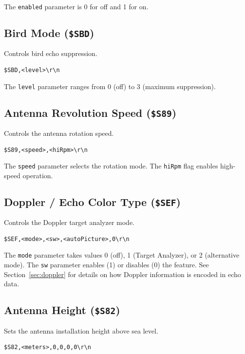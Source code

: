 \documentclass[11pt,letterpaper]{article}
\begin{document}
The \texttt{enabled} parameter is 0 for off and 1 for on.


\subsection{Bird Mode (\texttt{\$SBD})}

Controls bird echo suppression.

\begin{lstlisting}
$SBD,<level>\r\n
\end{lstlisting}

The \texttt{level} parameter ranges from 0 (off) to 3 (maximum suppression).


\subsection{Antenna Revolution Speed (\texttt{\$S89})}

Controls the antenna rotation speed.

\begin{lstlisting}
$S89,<speed>,<hiRpm>\r\n
\end{lstlisting}

The \texttt{speed} parameter selects the rotation mode. The \texttt{hiRpm} flag enables high-speed operation.


\subsection{Doppler / Echo Color Type (\texttt{\$SEF})}

Controls the Doppler target analyzer mode.

\begin{lstlisting}
$SEF,<mode>,<sw>,<autoPicture>,0\r\n
\end{lstlisting}

The \texttt{mode} parameter takes values 0 (off), 1 (Target Analyzer), or 2 (alternative mode). The \texttt{sw} parameter enables (1) or disables (0) the feature. See Section~\ref{sec:doppler} for details on how Doppler information is encoded in echo data.


\subsection{Antenna Height (\texttt{\$S82})}

Sets the antenna installation height above sea level.

\begin{lstlisting}
$S82,<meters>,0,0,0,0\r\n
\end{lstlisting}
\end{document}
